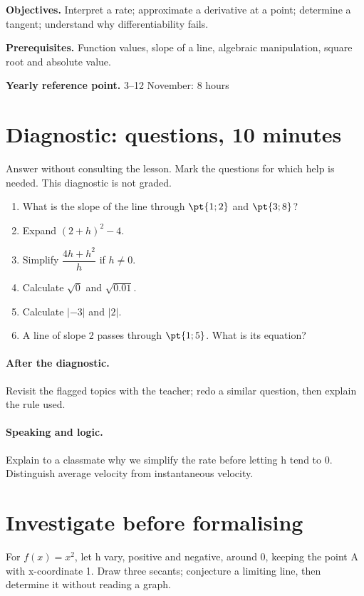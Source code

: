 \label{C04}
\begin{keypoint}
\textbf{Objectives.} Interpret a rate; approximate a derivative at a point; determine a tangent; understand why differentiability fails.

\textbf{Prerequisites.} Function values, slope of a line, algebraic manipulation, square root and absolute value.

\textbf{Yearly reference point.} 3--12 November: 8 hours\end{keypoint}
\section*{Diagnostic:  questions, 10 minutes}\label{C04-D}
Answer without consulting the lesson. Mark the questions for which help is needed. This diagnostic is not graded.
\begin{enumerate}
\item What is the slope of the line through $\pt{1;2}$ and $\pt{3;8}$?
\item Expand $(2+h)^2-4$.
\item Simplify $\dfrac{4h+h^2}{h}$ if $h\ne0$.
\item Calculate $\sqrt0$ and $\sqrt{\num{0,01}}$.
\item Calculate $|-3|$ and $|2|$.
\item A line of slope 2 passes through $\pt{1;5}$. What is its equation?
\end{enumerate}
\paragraph{After the diagnostic.} Revisit the flagged topics with the teacher; redo a similar question, then explain the rule used.
\paragraph{Speaking and logic.} Explain to a classmate why we simplify the rate before letting h tend to 0. Distinguish average velocity from instantaneous velocity.
\mxnewpage
\section*{Investigate before formalising}\label{C04-RECH}
For $f(x)=x^2$, let h vary, positive and negative, around 0, keeping the point A with x-coordinate 1. Draw three secants; conjecture a limiting line, then determine it without reading a graph.
